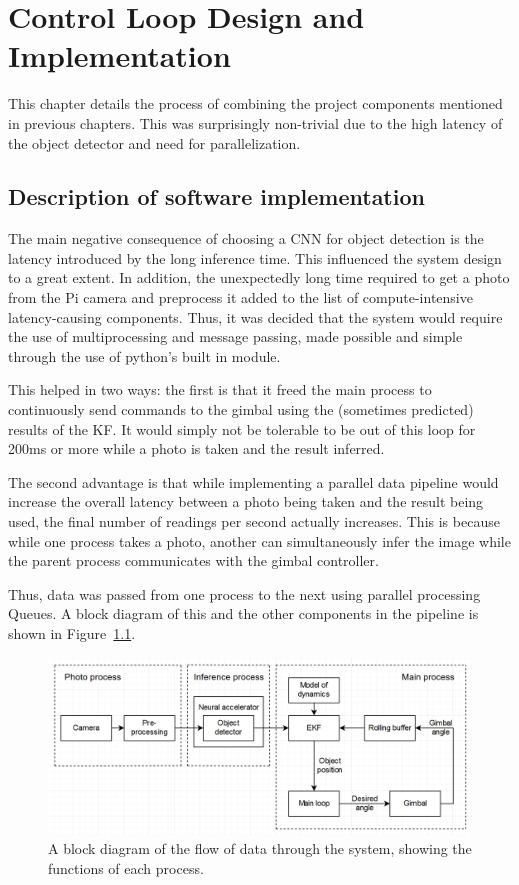 \chapter{Control Loop Design and Implementation}
This chapter details the process of combining the project components mentioned in previous chapters. This was surprisingly non-trivial due to the high latency of the object detector and need for parallelization.

\section{Description of software implementation}
The main negative consequence of choosing a CNN for object detection is the latency introduced by the long inference time. This influenced the system design to a great extent. In addition, the unexpectedly long time required to get a photo from the Pi camera and preprocess it added to the list of compute-intensive latency-causing components. Thus, it was decided that the system would require the use of multiprocessing and message passing, made possible and simple through the use of python's built in  module.

This helped in two ways: the first is that it freed the main process to continuously send commands to the gimbal using the (sometimes predicted) results of the KF. It would simply not be tolerable to be out of this loop for 200ms or more while a photo is taken and the result inferred.

The second advantage is that while implementing a parallel data pipeline would increase the overall latency between a photo being taken and the result being used, the final number of readings per second actually increases. This is because while one process takes a photo, another can simultaneously infer the image while the parent process communicates with the gimbal controller.

Thus, data was passed from one process to the next using parallel processing Queues. A block diagram of this and the other components in the pipeline is shown in Figure~\ref{fig:system_block_diagram}.

\begin{figure}[h!]
  \centering
  \includegraphics[width=\textwidth]{methodology/system_block_diagram2}
  \caption{\label{fig:system_block_diagram}A block diagram of the flow of data through the system, showing the functions of each process.}
\end{figure}

